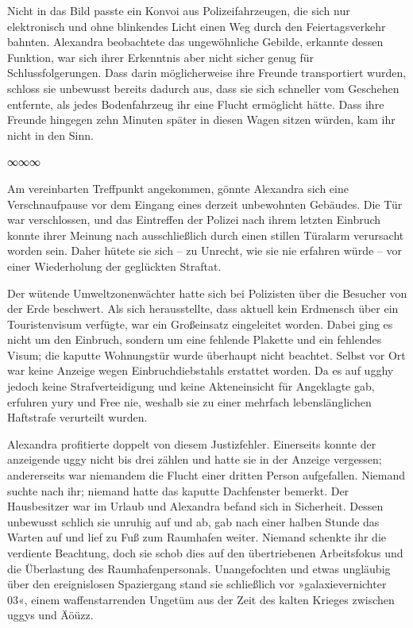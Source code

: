 Nicht in das Bild passte ein Konvoi aus Polizeifahrzeugen, die sich nur elektronisch und ohne blinkendes Licht einen Weg durch den Feiertagsverkehr bahnten. Alexandra beobachtete das ungewöhnliche Gebilde, erkannte dessen Funktion, war sich ihrer Erkenntnis aber nicht sicher genug für Schlussfolgerungen. Dass darin möglicherweise ihre Freunde transportiert wurden, schloss sie unbewusst bereits dadurch aus, dass sie sich schneller vom Geschehen entfernte, als jedes Bodenfahrzeug ihr eine Flucht ermöglicht hätte. Dass ihre Freunde hingegen zehn Minuten später in diesen Wagen sitzen würden, kam ihr nicht in den Sinn.

\begin{center}
∞∞∞
\end{center}

Am vereinbarten Treffpunkt angekommen, gönnte Alexandra sich eine Verschnaufpause vor dem Eingang eines derzeit unbewohnten Gebäudes. Die Tür war verschlossen, und das Eintreffen der Polizei nach ihrem letzten Einbruch konnte ihrer Meinung nach ausschließlich durch einen stillen Türalarm verursacht worden sein. Daher hütete sie sich – zu Unrecht, wie sie nie erfahren würde – vor einer Wiederholung der geglückten Straftat.

Der wütende Umweltzonenwächter hatte sich bei Polizisten über die Besucher von der Erde beschwert. Als sich herausstellte, dass aktuell kein Erdmensch über ein Touristenvisum verfügte, war ein Großeinsatz eingeleitet worden. Dabei ging es nicht um den Einbruch, sondern um eine fehlende Plakette und ein fehlendes Visum; die kaputte Wohnungstür wurde überhaupt nicht beachtet. Selbst vor Ort war keine Anzeige wegen Einbruchdiebstahls erstattet worden. Da es auf ugghy jedoch keine Strafverteidigung und keine Akteneinsicht für Angeklagte gab, erfuhren yury und Free nie, weshalb sie zu einer mehrfach lebenslänglichen Haftstrafe verurteilt wurden.

Alexandra profitierte doppelt von diesem Justizfehler. Einerseits konnte der anzeigende uggy nicht bis drei zählen und hatte sie in der Anzeige vergessen; andererseits war niemandem die Flucht einer dritten Person aufgefallen. Niemand suchte nach ihr; niemand hatte das kaputte Dachfenster bemerkt. Der Hausbesitzer war im Urlaub und Alexandra befand sich in Sicherheit. Dessen unbewusst schlich sie unruhig auf und ab, gab nach einer halben Stunde das Warten auf und lief zu Fuß zum Raumhafen weiter. Niemand schenkte ihr die verdiente Beachtung, doch sie schob dies auf den übertriebenen Arbeitsfokus und die Überlastung des Raumhafenpersonals. Unangefochten und etwas ungläubig über den ereignislosen Spaziergang stand sie schließlich vor »galaxievernichter 03«, einem waffenstarrenden Ungetüm aus der Zeit des kalten Krieges zwischen uggys und Äöüzz.

